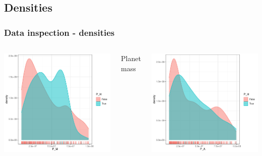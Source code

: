 \documentclass[compress]{beamer}
\begin{document}
\subsection{Densities}
\begin{frame}
\frametitle{Data inspection - densities}
\begin{columns}[t]
        \includegraphics[width=\linewidth]{Pic/Density/P_M.pdf}
        \begin{center}
        Planet mass\\
        \end{center}
        \includegraphics[width=\linewidth]{Pic/Density/P_A.pdf}

\end{columns}
\end{frame}
\end{document}
